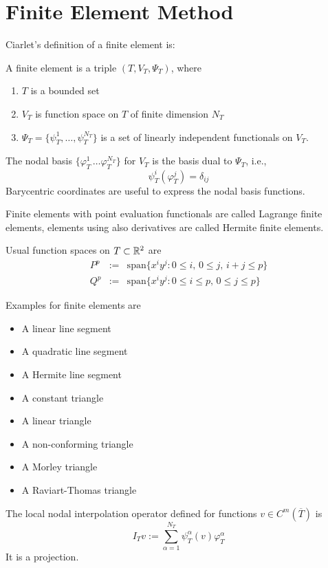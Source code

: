 
\chapter{Finite Element Method}

Ciarlet's definition of a finite element is:

\begin{definition} A finite element is a triple $(T, V_{T}, \Psi_{T})$, where
\begin{enumerate}
\item $T$ is a bounded set
\item $V_{T}$ is function space on $T$ of finite dimension $N_T$ 
\item $\Psi_{T} = \{ \psi^1_T, \ldots , \psi^{N_T}_T \}$ is a set of linearly independent functionals on $V_{T}$.
\end{enumerate}
\end{definition}

\noindent
The nodal basis $\{\varphi^1_T\, \ldots \varphi^{N_T}_T\}$ for $V_T$ is the basis 
dual to $\Psi_T$, i.e., 
$$
\psi^i_T (\varphi^j_T) = \delta_{ij}
$$
Barycentric coordinates are useful to express the nodal basis functions.


Finite elements with point evaluation functionals are called Lagrange  
finite elements, elements using also derivatives are called Hermite finite elements.

Usual function spaces on $T \subset {\mathbb R}^2$ are
\begin{eqnarray*}
P^p & := & \mbox{span} \{ x^i y^j : 0 \leq i, \, 0 \leq j, \, i+j \leq p \} \\
Q^p & := & \mbox{span} \{ x^i y^j : 0 \leq i \leq p, \, 0 \leq j \leq p  \}
\end{eqnarray*}

Examples for finite elements are
\begin{itemize}
\item A linear line segment 
\item A quadratic line segment
\item A Hermite line segment
\item A constant triangle
\item A linear triangle
\item A non-conforming triangle
\item A Morley triangle
\item A Raviart-Thomas triangle
\end{itemize}
The local nodal interpolation operator defined for functions $v \in C^m(\overline T)$ is
$$
I_T v := \sum_{\alpha = 1}^{N_T} \psi^\alpha_T(v) \varphi^\alpha_T
$$
It is a projection.


